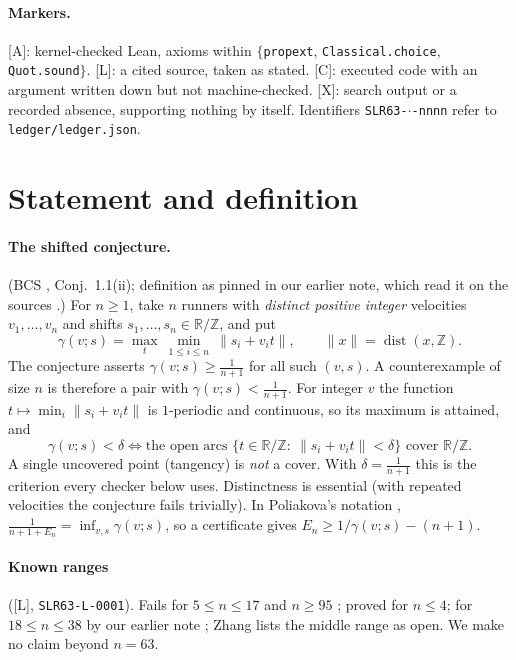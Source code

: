 \documentclass[10pt]{article}
\newcommand{\tier}[1]{\textsf{[#1]}}
\newcommand{\tA}{\tier{A}}
\newcommand{\tL}{\tier{L}}
\newcommand{\tC}{\tier{C}}
\newcommand{\tX}{\tier{X}}
\newcommand{\lean}[1]{\texttt{#1}}
\newcommand{\R}{\mathbb{R}}
\newcommand{\Z}{\mathbb{Z}}
\newcommand{\dist}{\operatorname{dist}}
\begin{document}
\paragraph{Markers.} \tA{}: kernel-checked Lean, axioms within $\{$\lean{propext}, \lean{Classical.choice}, \lean{Quot.sound}$\}$. \tL{}: a cited source, taken as stated. \tC{}: executed code with an argument written down but not machine-checked. \tX{}: search output or a recorded absence, supporting nothing by itself. Identifiers \texttt{SLR63-$\cdot$-nnnn} refer to \texttt{ledger/ledger.json}.

\section{Statement and definition}\label{sec:setting}
\paragraph{The shifted conjecture.} (BCS \cite{bcs}, Conj.~1.1(ii); definition as pinned in our earlier note, which read it on the sources \cite{bcs,zhang,pol}.) For $n\ge1$, take $n$ runners with \emph{distinct positive integer} velocities $v_1,\dots,v_n$ and shifts $s_1,\dots,s_n\in\R/\Z$, and put
\[
\gamma(v;s)=\max_{t}\ \min_{1\le i\le n}\ \|s_i+v_it\|,\qquad \|x\|=\dist(x,\Z).
\]
The conjecture asserts $\gamma(v;s)\ge\frac1{n+1}$ for all such $(v,s)$. A counterexample of size $n$ is therefore a pair with $\gamma(v;s)<\frac1{n+1}$. For integer $v$ the function $t\mapsto\min_i\|s_i+v_it\|$ is $1$-periodic and continuous, so its maximum is attained, and
\[
\gamma(v;s)<\delta\iff\text{the open arcs }\{t\in\R/\Z:\ \|s_i+v_it\|<\delta\}\text{ cover }\R/\Z .
\]
A single uncovered point (tangency) is \emph{not} a cover. With $\delta=\frac1{n+1}$ this is the criterion every checker below uses. Distinctness is essential (with repeated velocities the conjecture fails trivially). In Poliakova's notation \cite{pol}, $\frac1{n+1+E_n}=\inf_{v,s}\gamma(v;s)$, so a certificate gives $E_n\ge1/\gamma(v;s)-(n+1)$.

\paragraph{Known ranges} (\tL{}, \texttt{SLR63-L-0001}). Fails for $5\le n\le17$ \cite{bcs} and $n\ge95$ \cite{pol}; proved for $n\le4$; for $18\le n\le38$ by our earlier note \cite{slr18}; Zhang \cite{zhang} lists the middle range as open. We make no claim beyond $n=63$.
\end{document}
